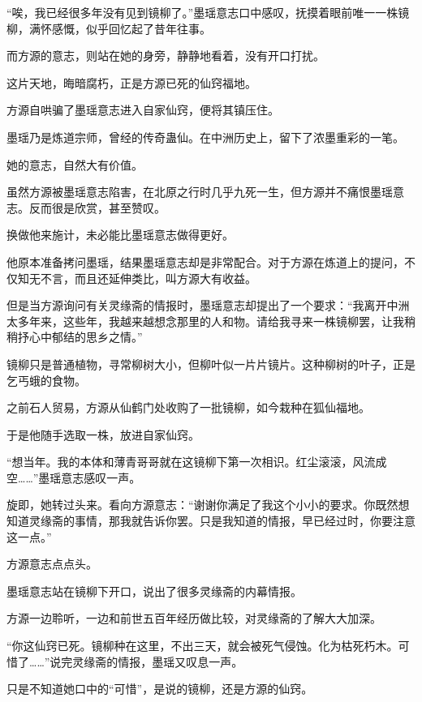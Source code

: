 
\begin{this_body}

“唉，我已经很多年没有见到镜柳了。”墨瑶意志口中感叹，抚摸着眼前唯一一株镜柳，满怀感慨，似乎回忆起了昔年往事。

而方源的意志，则站在她的身旁，静静地看着，没有开口打扰。

这片天地，晦暗腐朽，正是方源已死的仙窍福地。

方源自哄骗了墨瑶意志进入自家仙窍，便将其镇压住。

墨瑶乃是炼道宗师，曾经的传奇蛊仙。在中洲历史上，留下了浓墨重彩的一笔。

她的意志，自然大有价值。

虽然方源被墨瑶意志陷害，在北原之行时几乎九死一生，但方源并不痛恨墨瑶意志。反而很是欣赏，甚至赞叹。

换做他来施计，未必能比墨瑶意志做得更好。

他原本准备拷问墨瑶，结果墨瑶意志却是非常配合。对于方源在炼道上的提问，不仅知无不言，而且还延伸类比，叫方源大有收益。

但是当方源询问有关灵缘斋的情报时，墨瑶意志却提出了一个要求：“我离开中洲太多年来，这些年，我越来越想念那里的人和物。请给我寻来一株镜柳罢，让我稍稍抒心中郁结的思乡之情。”

镜柳只是普通植物，寻常柳树大小，但柳叶似一片片镜片。这种柳树的叶子，正是乞丐蛾的食物。

之前石人贸易，方源从仙鹤门处收购了一批镜柳，如今栽种在狐仙福地。

于是他随手选取一株，放进自家仙窍。

“想当年。我的本体和薄青哥哥就在这镜柳下第一次相识。红尘滚滚，风流成空……”墨瑶意志感叹一声。

旋即，她转过头来。看向方源意志：“谢谢你满足了我这个小小的要求。你既然想知道灵缘斋的事情，那我就告诉你罢。只是我知道的情报，早已经过时，你要注意这一点。”

方源意志点点头。

墨瑶意志站在镜柳下开口，说出了很多灵缘斋的内幕情报。

方源一边聆听，一边和前世五百年经历做比较，对灵缘斋的了解大大加深。

“你这仙窍已死。镜柳种在这里，不出三天，就会被死气侵蚀。化为枯死朽木。可惜了……”说完灵缘斋的情报，墨瑶又叹息一声。

只是不知道她口中的“可惜”，是说的镜柳，还是方源的仙窍。


\end{this_body}
